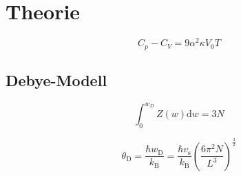 \section{Theorie}
\label{sec:Theorie}

\begin{equation}
    C_p - C_V = 9\alpha^2\kappa V_0 T
    \label{eqn:Umrechnung}
\end{equation}

\subsection{Debye-Modell}

\begin{equation}
    \int_0^{w_D} Z\left(w\right)\text{d}w = 3N
    \label{eqn:Natome}
\end{equation}

\begin{equation}
    \theta_\text{D} = \frac{\hbar w_\text{D}}{k_\text{B}} = \frac{\hbar v_\text{s}}{k_\text{B}}\left(\frac{6\pi^2N}{L^3}\right)^{\frac{3}{2}}
    \label{eqn:Debye}
\end{equation}
